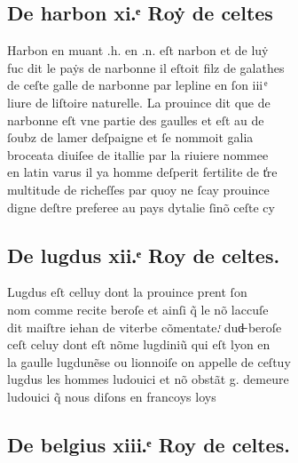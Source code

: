 \documentclass[12pt]{article}
\begin{document}
\newpage






\subsection*{De harbon xi.ͤ Roẏ de
          celtes}


Harbon en muant .h. en .n. eſt narbon et de
            luẏ\\
fuc dit le paẏs de narbonne il eſtoit filz de galathes\\
de ceſte galle de narbonne par lepline en ſon iii ͤ\\
liure de liſtoire naturelle. La prouince dit que de\\
narbonne eſt vne partie des gaulles et eſt au de\\
ſoubz de lamer
          deſpaigne et ſe nommoit galia\\
broceata diuiſee de itallie par la riuiere
            nommee\\
en latin varus il ya homme deſperit fertilite de t̾re\\
multitude de richeſſes par quoy ne ſcay prouince\\
digne deſtre preferee au
          pays dytalie ſinõ ceſte cy





\subsection*{De lugdus xii.ͤ Roy de
          celtes.}


Lugdus eſt celluy dont la prouince prent
            ſon\\
nom comme recite beroſe et ainſi q̃ le
          nõ laccuſe\\
dit maiſtre iehan de viterbe
          cõmentate.ͬ dud̶ beroſe\\
ceſt celuy dont eſt
          nõme lugdiniũ qui eſt lyon en\\
la gaulle lugdunẽse ou lionnoiſe on appelle de
            ceſtuy\\
lugdus les hommes ludouici et nõ
          obstãt g. demeure\\
ludouici q̃ nous diſons en francoys loys





\subsection*{De belgius xiii.ͤ Roy de celtes.}
\end{document}

